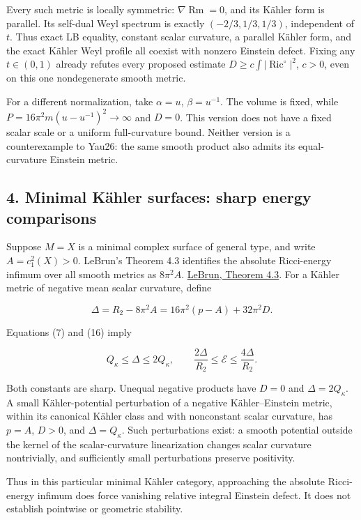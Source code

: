 \documentclass[
  11pt,
]{article}
\begin{document}
Every such metric is locally symmetric: \(\nabla\operatorname{Rm}=0\),
and its Kähler form is parallel. Its self-dual Weyl spectrum is exactly
\((-2/3,1/3,1/3)\), independent of \(t\). Thus exact LB equality,
constant scalar curvature, a parallel Kähler form, and the exact Kähler
Weyl profile all coexist with nonzero Einstein defect. Fixing any
\(t\in(0,1)\) already refutes every proposed estimate
\(D\ge c\int|\operatorname{Ric}^{\circ}|^2\), \(c>0\), even on this one
nondegenerate smooth metric.

For a different normalization, take \(\alpha=u\), \(\beta=u^{-1}\). The
volume is fixed, while \(P=16\pi^2m(u-u^{-1})^2\to\infty\) and \(D=0\).
This version does not have a fixed scalar scale or a uniform
full-curvature bound. Neither version is a counterexample to Yau26: the
same smooth product also admits its equal-curvature Einstein metric.

\hypertarget{minimal-kuxe4hler-surfaces-sharp-energy-comparisons}{%
\subsection{4. Minimal Kähler surfaces: sharp energy
comparisons}\label{minimal-kuxe4hler-surfaces-sharp-energy-comparisons}}

Suppose \(M=X\) is a minimal complex surface of general type, and write
\(A=c_1^2(X)>0\). LeBrun's Theorem 4.3 identifies the absolute
Ricci-energy infimum over all smooth metrics as \(8\pi^2 A\).
\href{https://arxiv.org/pdf/math/0003068}{LeBrun, Theorem 4.3}. For a
Kähler metric of negative mean scalar curvature, define

\[
 \Delta=R_2-8\pi^2 A
       =16\pi^2(p-A)+32\pi^2D.
 \tag{16}
\]

Equations (7) and (16) imply

\[
 \boxed{Q_\kappa\le\Delta\le2Q_\kappa,\qquad
 \frac{2\Delta}{R_2}\le\mathcal E\le\frac{4\Delta}{R_2}.}
 \tag{17}
\]

Both constants are sharp. Unequal negative products have \(D=0\) and
\(\Delta=2Q_\kappa\). A small Kähler-potential perturbation of a
negative Kähler--Einstein metric, within its canonical Kähler class and
with nonconstant scalar curvature, has \(p=A\), \(D>0\), and
\(\Delta=Q_\kappa\). Such perturbations exist: a smooth potential
outside the kernel of the scalar-curvature linearization changes scalar
curvature nontrivially, and sufficiently small perturbations preserve
positivity.

Thus in this particular minimal Kähler category, approaching the
absolute Ricci-energy infimum does force vanishing relative integral
Einstein defect. It does not establish pointwise or geometric stability.
\end{document}
